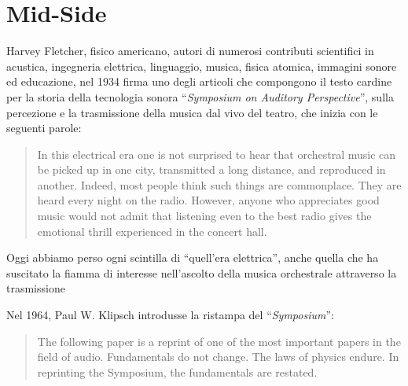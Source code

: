 \section{Mid-Side}
Harvey Fletcher, fisico americano, autori di numerosi contributi scientifici in
acustica, ingegneria elettrica, linguaggio, musica, fisica atomica, immagini
sonore ed educazione, nel 1934 firma uno degli articoli che compongono il testo
cardine per la storia della tecnologia sonora “\emph{Symposium on Auditory
Perspective}”, sulla percezione e la trasmissione della musica dal vivo del
teatro, che inizia con le seguenti parole:

\begin{quotation}
In this electrical era one is not surprised to hear that orchestral music can be
picked up in one city, transmitted a long distance, and reproduced in another.
Indeed, most people think such things are commonplace. They are heard every
night on the radio. However, anyone who appreciates good music would not admit
that listening even to the best radio gives the emotional thrill experienced in
the concert hall. \cite{hf34}
\end{quotation}

Oggi abbiamo perso ogni scintilla di “quell'era elettrica”, anche quella che ha
suscitato la fiamma di interesse nell'ascolto della musica orchestrale
attraverso la trasmissione


Nel 1964, Paul W. Klipsch introdusse la ristampa del “\emph{Symposium}”:

\begin{quotation}
The following paper is a reprint of one of the most important papers in the
field of audio. Fundamentals do not change. The laws of physics endure. In
reprinting the Symposium, the fundamentals are restated. \cite{sap1964}
\end{quotation}

